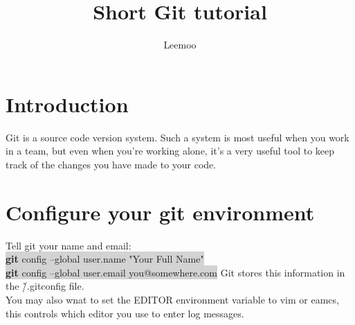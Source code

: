 \documentclass{article}
\author{\Large{Leemoo}}
\title{ Short Git tutorial}
\begin{document}
\maketitle
\tableofcontents
\section{Introduction}
  Git is a source code version system. Such a system is most useful when you work in a team, but even when you're working alone, it's a very useful tool to keep track of the changes you have made to your code.\\
\section{Configure your git environment}
  Tell git your name and email:\\
  \colorbox{lightgray}
  {\textbf{git} config --global user.name "Your Full Name"}\\
  \colorbox{lightgray}
  {\textbf{git} config --global user.email you@somewhere.com}
  Git stores this information in the \~/.gitconfig file.\\
  You may also wnat to set the EDITOR environment variable to vim or eamcs, this controls which editor you use to enter log messages.\\
\end{document}
